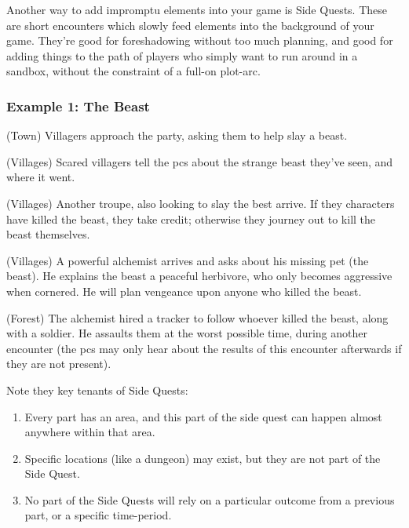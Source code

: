\begin{multicols}{2}

\noindent
Another way to add impromptu elements into your game is Side Quests.
These are short encounters which slowly feed elements into the background of your game.
They're good for foreshadowing without too much planning, and good for adding things to the path of players who simply want to run around in a sandbox, without the constraint of a full-on plot-arc.

\subsubsection{Example 1: The Beast}

\begin{list}{\sqn}{}

  \item[\sqr]
  (Town) Villagers approach the party, asking them to help slay a beast.
  \item
  (Villages)
  Scared villagers tell the \glspl{pc} about the strange beast they've seen, and where it went.
  \item
  (Villages) Another troupe, also looking to slay the best arrive. If they characters have killed the beast, they take credit; otherwise they journey out to kill the beast themselves.
  \item
  (Villages)
  A powerful alchemist arrives and asks about his missing pet (the beast).
  He explains the beast a peaceful herbivore, who only becomes aggressive when cornered.
  He will plan vengeance upon anyone who killed the beast.
  \item
  (Forest) \squash
  The alchemist hired a tracker to follow whoever killed the beast, along with a soldier.
  He assaults them at the worst possible time, during another encounter (the \glspl{pc} may only hear about the results of this encounter afterwards if they are not present).

\end{list}

Note they key tenants of Side Quests:

\begin{enumerate}

  \item
  Every part has an area, and this part of the side quest can happen almost anywhere within that area.
  \item
  Specific locations (like a dungeon) may exist, but they are not part of the Side Quest.
  \item
  No part of the Side Quests will rely on a particular outcome from a previous part, or a specific time-period.


\end{enumerate}
\end{multicols}
